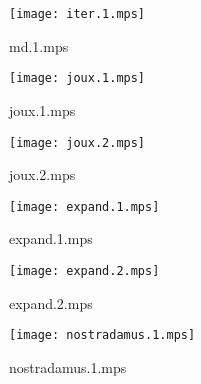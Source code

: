 \documentclass[letterpaper,10pt]{article}
\begin{document}
\begin{figure}
    \centering
    \texttt{[image: iter.1.mps]}
    \caption{md.1.mps}
\end{figure}

\begin{figure}
    \centering
    \texttt{[image: joux.1.mps]}
    \caption{joux.1.mps}
\end{figure}

\begin{figure}
    \centering
    \texttt{[image: joux.2.mps]}
    \caption{joux.2.mps}
\end{figure}

\begin{figure}
    \centering
    \texttt{[image: expand.1.mps]}
    \caption{expand.1.mps}
\end{figure}

\begin{figure}
    \centering
    \texttt{[image: expand.2.mps]}
    \caption{expand.2.mps}
\end{figure}

\begin{figure}
    \centering
    \texttt{[image: nostradamus.1.mps]}
    \caption{nostradamus.1.mps}
\end{figure}
\end{document}
